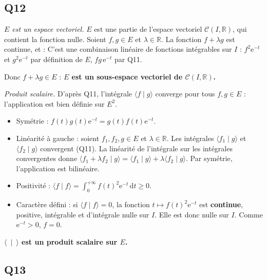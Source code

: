 \documentclass[11pt,a4paper]{article}
\providecommand{\tightlist}{\setlength{\itemsep}{0pt}\setlength{\parskip}{0pt}}
\newcommand{\equationajustee}[1]{%
  \sbox{\boiteequation}{$\displaystyle #1$}%
  \ifdim\wd\boiteequation>\linewidth
    \[\resizebox{\linewidth}{!}{\usebox{\boiteequation}}\]%
  \else
    \[#1\]%
  \fi}
\begin{document}
\hypertarget{q12}{%
\subsection{Q12}\label{q12}}

\emph{\(E\) est un espace vectoriel.} \(E\) est une partie de l'espace vectoriel \(\mathcal C(I,\mathbb R)\), qui contient la fonction nulle. Soient \(f,g\in E\) et \(\lambda\in\mathbb R\). La fonction \(f+\lambda g\) est continue, et :
\equationajustee{(f+\lambda g)^2(t)\mathrm e^{-t}=f(t)^2\mathrm e^{-t}+2\lambda f(t)g(t)\mathrm e^{-t}+\lambda^2g(t)^2\mathrm e^{-t}.}
C'est une combinaison linéaire de fonctions intégrables sur \(I\) : \(f^2\mathrm e^{-t}\) et \(g^2\mathrm e^{-t}\) par définition de \(E\), \(fg\,\mathrm e^{-t}\) par Q11.

Donc \(f+\lambda g\in E\) : \textbf{\(E\) est un sous-espace vectoriel de \(\mathcal C(I,\mathbb R)\).}

\emph{Produit scalaire.} D'après Q11, l'intégrale \(\langle f\mid g\rangle\) converge pour tous \(f,g\in E\) : l'application est bien définie sur \(E^2\).

\begin{itemize}
\tightlist
\item
  Symétrie : \(f(t)g(t)\mathrm e^{-t}=g(t)f(t)\mathrm e^{-t}\).
\item
  Linéarité à gauche : soient \(f_1,f_2,g\in E\) et \(\lambda\in\mathbb R\). Les intégrales \(\langle f_1\mid g\rangle\) et \(\langle f_2\mid g\rangle\) convergent (Q11). La linéarité de l'intégrale sur les intégrales convergentes donne \(\langle f_1+\lambda f_2\mid g\rangle=\langle f_1\mid g\rangle+\lambda\langle f_2\mid g\rangle\). Par symétrie, l'application est bilinéaire.
\item
  Positivité : \(\langle f\mid f\rangle=\int_0^{+\infty}f(t)^2\mathrm e^{-t}\,\mathrm dt\ge0\).
\item
  Caractère défini : si \(\langle f\mid f\rangle=0\), la fonction \(t\mapsto f(t)^2\mathrm e^{-t}\) est \textbf{continue}, positive, intégrable et d'intégrale nulle sur \(I\). Elle est donc nulle sur \(I\). Comme \(\mathrm e^{-t}>0\), \(f=0\).
\end{itemize}

\textbf{\(\langle\ \mid\ \rangle\) est un produit scalaire sur \(E\).}

\hypertarget{q13}{%
\subsection{Q13}\label{q13}}
\end{document}
